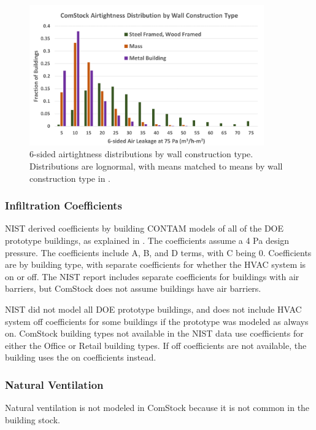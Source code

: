 \begin{figure}
    \centering \includegraphics[width=0.9\textwidth]{figures/airtightness_by_wall_construction_type.png}
    \caption[Airtightness by Wall Construction Type]{6-sided airtightness distributions by wall construction type. Distributions are lognormal, with means matched to means by wall construction type in \citep{nist_infiltration_data}.}
    \label{fig:airtightness_by_wall_construction_type}
\end{figure}

\subsubsection{Infiltration Coefficients}
NIST derived coefficients by building CONTAM models of all of the DOE prototype buildings, as explained in \citep{nist_infiltration_correlations}. The coefficients assume a 4 Pa design pressure. The coefficients include A, B, and D terms, with C being 0. Coefficients are by building type, with separate coefficients for whether the HVAC system is on or off. The NIST report includes separate coefficients for buildings with air barriers, but ComStock does not assume buildings have air barriers.

NIST did not model all DOE prototype buildings, and does not include HVAC system off coefficients for some buildings if the prototype was modeled as always on. ComStock building types not available in the NIST data use coefficients for either the Office or Retail building types. If off coefficients are not available, the building uses the on coefficients instead.
\subsubsection{Natural Ventilation}

Natural ventilation is not modeled in ComStock because it is not common in the building stock.
